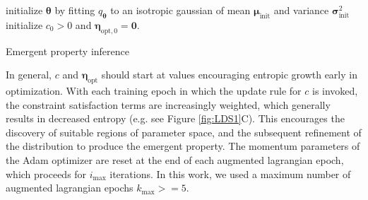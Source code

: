 \documentclass[11pt]{article}
\begin{document}
\begin{algorithm}\label{alg:epi}
\SetAlgoLined
 initialize $\bm{\theta}$ by fitting $q_{\bm{\theta}}$ to an isotropic gaussian of mean $\bm{\mu}_{\text{init}}$ and variance $\bm{\sigma}_{\text{init}}^2$ \\
 initialize $c_0 > 0$ and $\bm{\eta}_{\text{opt},0} = \mathbf{0}$. \\
 \caption{Emergent property inference}
\end{algorithm}

In general, $c$ and $\bm{\eta}_{\text{opt}}$ should start at values encouraging entropic growth early in optimization.  
With each training epoch in which the update rule for $c$ is invoked, the constraint satisfaction terms are increasingly weighted, which generally results in decreased entropy (e.g. see Figure \ref{fig:LDS1}C).
This encourages the discovery of suitable regions of parameter space, and the subsequent refinement of the distribution to produce the emergent property.
The momentum parameters of the Adam optimizer are reset at the end of each augmented lagrangian epoch, which proceeds for $i_{\text{max}}$ iterations.
In this work, we used a maximum number of augmented lagrangian epochs $k_{\text{max}} >= 5$.
\end{document}
